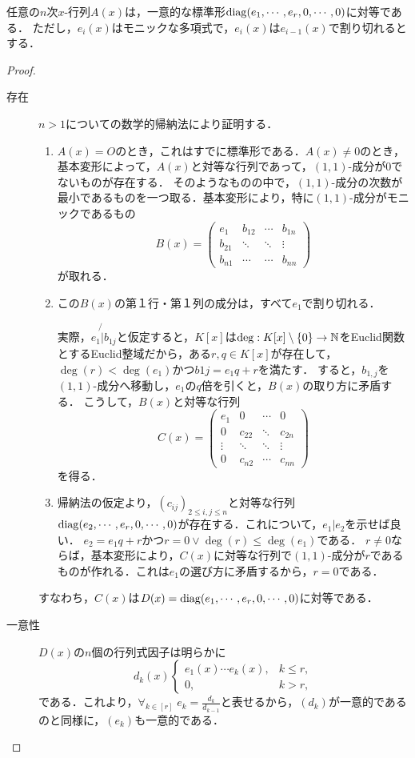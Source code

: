 \documentclass[uplatex,dvipdfmx]{jsreport}
\begin{document}
\begin{theorem}
    任意の$n$次$x$-行列$A(x)$は，一意的な標準形$\mathrm{diag}(e_1,\cdots,e_r,0,\cdots,0)$に対等である．
    ただし，$e_i(x)$はモニックな多項式で，$e_i(x)$は$e_{i-1}(x)$で割り切れるとする．
\end{theorem}
\begin{proof}\mbox{}
    \begin{description}
        \item[存在] $n>1$についての数学的帰納法により証明する．
        \begin{enumerate}
            \item $A(x)=O$のとき，これはすでに標準形である．$A(x)\ne0$のとき，基本変形によって，$A(x)$と対等な行列であって，$(1,1)$-成分が$0$でないものが存在する．
            そのようなものの中で，$(1,1)$-成分の次数が最小であるものを一つ取る．基本変形により，特に$(1,1)$-成分がモニックであるもの
            \[B(x)=\begin{pmatrix}e_1&b_{12}&\cdots&b_{1n}\\b_{21}&\ddots&\ddots&\vdots\\b_{n1}&\cdots&\cdots&b_{nn}\end{pmatrix}\]
            が取れる．
            \item この$B(x)$の第１行・第１列の成分は，すべて$e_1$で割り切れる．
            
            実際，$e_1\not{|}b_{1j}$と仮定すると，$K[x]$は$\deg:K[x]\setminus\{0\}\to\mathbb{N}$をEuclid関数とするEuclid整域だから，ある$r,q\in K[x]$が存在して，$\deg(r)<\deg(e_1)$かつ$b{1j}=e_1q+r$を満たす．
            すると，$b_{1,j}$を$(1,1)$-成分へ移動し，$e_1$の$q$倍を引くと，$B(x)$の取り方に矛盾する．
            こうして，$B(x)$と対等な行列
            \[C(x)=\begin{pmatrix}e_1&0&\cdots&0\\0&c_{22}&\ddots&c_{2n}\\\vdots&\ddots&\ddots&\vdots\\0&c_{n2}&\cdots&c_{nn}\end{pmatrix}\]
            を得る．
            \item 帰納法の仮定より，$(c_{ij})_{2\le i,j\le n}$と対等な行列$\mathrm{diag}(e_2,\cdots,e_r,0,\cdots,0)$が存在する．これについて，$e_1|e_2$を示せば良い．
            $e_2=e_1q+r$かつ$r=0\lor\deg(r)\le\deg(e_1)$である．
            $r\ne 0$ならば，基本変形により，$C(x)$に対等な行列で$(1,1)$-成分が$r$であるものが作れる．これは$e_1$の選び方に矛盾するから，$r=0$である．
        \end{enumerate}
        すなわち，$C(x)$は$D(x)=\mathrm{diag}(e_1,\cdots,e_r,0,\cdots,0)$に対等である．
        \item[一意性] 
        $D(x)$の$n$個の行列式因子は明らかに
        \[d_k(x)\begin{cases}
            e_1(x)\cdots e_k(x),&k\le r,\\
            0,&k>r,
        \end{cases}\]
        である．これより，$\forall_{k\in[r]}\;e_k=\frac{d_k}{d_{k-1}}$と表せるから，$(d_k)$が一意的であるのと同様に，$(e_k)$も一意的である．
    \end{description}
\end{proof}
\end{document}
